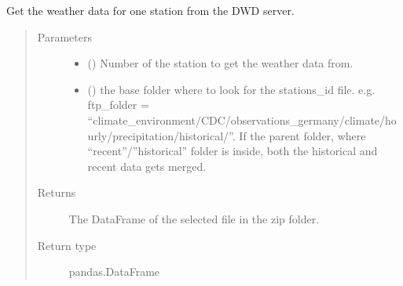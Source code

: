 \documentclass[letterpaper,10pt,english]{sphinxmanual}
\begin{document}

\begin{fulllineitems}
\label{\detokenize{weatherDB.lib.max_fun:weatherDB.lib.max_fun.import_DWD.get_dwd_data}}
\sphinxAtStartPar
Get the weather data for one station from the DWD server.
\begin{quote}\begin{description}
\item[{Parameters}] \leavevmode\begin{itemize}
\item {} 
\sphinxAtStartPar
{} () \textendash{} Number of the station to get the weather data from.

\item {} 
\sphinxAtStartPar
{} () \textendash{} the base folder where to look for the stations\_id file.
e.g. ftp\_folder = “climate\_environment/CDC/observations\_germany/climate/hourly/precipitation/historical/”.
If the parent folder, where “recent”/”historical” folder is inside, both the historical and recent data gets merged.

\end{itemize}

\item[{Returns}] \leavevmode
\sphinxAtStartPar
The DataFrame of the selected file in the zip folder.

\item[{Return type}] \leavevmode
\sphinxAtStartPar
pandas.DataFrame

\end{description}\end{quote}

\end{fulllineitems}

\end{document}
